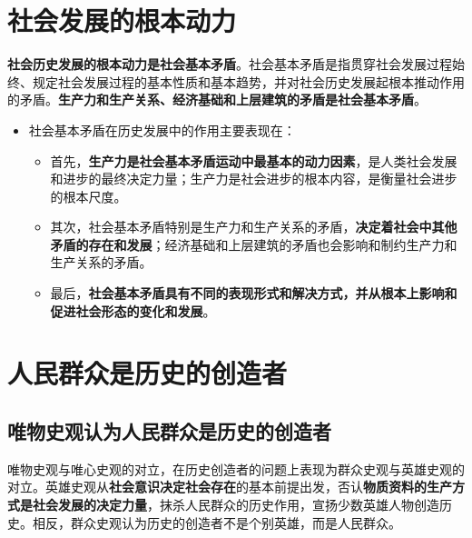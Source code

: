 \documentclass[
]{article}
\begin{document}
\hypertarget{ux793eux4f1aux53d1ux5c55ux7684ux6839ux672cux52a8ux529b}{%
\section{社会发展的根本动力}\label{ux793eux4f1aux53d1ux5c55ux7684ux6839ux672cux52a8ux529b}}

\textbf{社会历史发展的根本动力是社会基本矛盾}。社会基本矛盾是指贯穿社会发展过程始终、规定社会发展过程的基本性质和基本趋势，并对社会历史发展起根本推动作用的矛盾。\textbf{生产力和生产关系、经济基础和上层建筑的矛盾是社会基本矛盾}。

\begin{itemize}
\item
  社会基本矛盾在历史发展中的作用主要表现在：

  \begin{itemize}
  \item
    首先，\textbf{生产力是社会基本矛盾运动中最基本的动力因素}，是人类社会发展和进步的最终决定力量；生产力是社会进步的根本内容，是衡量社会进步的根本尺度。
  \item
    其次，社会基本矛盾特别是生产力和生产关系的矛盾，\textbf{决定着社会中其他矛盾的存在和发展}；经济基础和上层建筑的矛盾也会影响和制约生产力和生产关系的矛盾。
  \item
    最后，\textbf{社会基本矛盾具有不同的表现形式和解决方式，并从根本上影响和促进社会形态的变化和发展}。
  \end{itemize}
\end{itemize}

\hypertarget{ux4ebaux6c11ux7fa4ux4f17ux662fux5386ux53f2ux7684ux521bux9020ux8005}{%
\section{人民群众是历史的创造者}\label{ux4ebaux6c11ux7fa4ux4f17ux662fux5386ux53f2ux7684ux521bux9020ux8005}}

\hypertarget{ux552fux7269ux53f2ux89c2ux8ba4ux4e3aux4ebaux6c11ux7fa4ux4f17ux662fux5386ux53f2ux7684ux521bux9020ux8005}{%
\subsection{唯物史观认为人民群众是历史的创造者}\label{ux552fux7269ux53f2ux89c2ux8ba4ux4e3aux4ebaux6c11ux7fa4ux4f17ux662fux5386ux53f2ux7684ux521bux9020ux8005}}

唯物史观与唯心史观的对立，在历史创造者的问题上表现为群众史观与英雄史观的对立。英雄史观从\textbf{社会意识决定社会存在}的基本前提出发，否认\textbf{物质资料的生产方式是社会发展的决定力量}，抹杀人民群众的历史作用，宣扬少数英雄人物创造历史。相反，群众史观认为历史的创造者不是个别英雄，而是人民群众。
\end{document}
